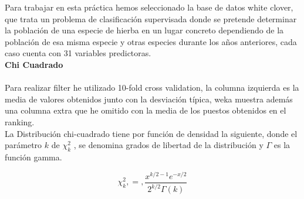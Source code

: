 \documentclass[es]{ifirak}
\begin{document}
Para trabajar en esta práctica hemos seleccionado la base de datos white clover, que trata un problema de clasificación supervisada donde se pretende determinar la población de una especie de hierba en un lugar concreto dependiendo de la población de esa misma especie y otras especies durante los años anteriores, cada caso cuenta con 31 variables predictoras.\\

\textbf{Chi Cuadrado }
\paragraph{}
Para realizar filter he utilizado 10-fold cross validation, la columna izquierda es la media de valores obtenidos junto con la desviación típica, weka muestra además una columna extra que he omitido con la media de los puestos obtenidos en el ranking.\\

La Distribución chi-cuadrado tiene por función de densidad la siguiente, donde el parámetro $k$ de  $\chi^2_k$ , se denomina grados de libertad de la distribución y $\varGamma$ es la función gamma.

\begin{displaymath}
	\chi^2_k,=, \dfrac{x^{k/2-1}e^{-x/2}}{2^{k/2}\varGamma(k)}
\end{displaymath}
\end{document}
